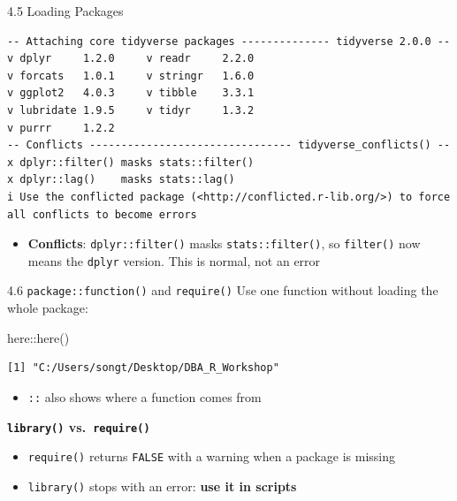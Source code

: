 \documentclass[
  ignorenonframetext,
  aspectratio=169,
]{beamer}
\newenvironment{Shaded}{\begin{snugshade}}{\end{snugshade}}
\newcommand{\FunctionTok}[1]{\textcolor[rgb]{0.28,0.35,0.67}{#1}}
\newcommand{\NormalTok}[1]{\textcolor[rgb]{0.00,0.23,0.31}{#1}}
\newcommand{\SpecialCharTok}[1]{\textcolor[rgb]{0.37,0.37,0.37}{#1}}
\providecommand{\tightlist}{%
  \setlength{\itemsep}{0pt}\setlength{\parskip}{0pt}}
\begin{document}
\begin{frame}[fragile]{4.5 Loading Packages}
\endgroup

\begingroup\tiny\color{darkgray}

\begin{verbatim}
-- Attaching core tidyverse packages -------------- tidyverse 2.0.0 --
v dplyr     1.2.0     v readr     2.2.0
v forcats   1.0.1     v stringr   1.6.0
v ggplot2   4.0.3     v tibble    3.3.1
v lubridate 1.9.5     v tidyr     1.3.2
v purrr     1.2.2     
-- Conflicts -------------------------------- tidyverse_conflicts() --
x dplyr::filter() masks stats::filter()
x dplyr::lag()    masks stats::lag()
i Use the conflicted package (<http://conflicted.r-lib.org/>) to force all conflicts to become errors
\end{verbatim}

\endgroup

\begin{itemize}
\tightlist
\item
  \textbf{Conflicts}: \texttt{dplyr::filter()} masks
  \texttt{stats::filter()}, so \texttt{filter()} now means the
  \texttt{dplyr} version. This is normal, not an error
\end{itemize}
\end{frame}

\begin{frame}[fragile]{4.6 \texttt{package::function()} and
\texttt{require()}}
\protect{}\label{packagefunction-and-require}
Use one function without loading the whole package:

\begin{Shaded}
\begin{Highlighting}[]
\NormalTok{here}\SpecialCharTok{::}\FunctionTok{here}\NormalTok{()}
\end{Highlighting}
\end{Shaded}

\begingroup\tiny\color{darkgray}

\begin{verbatim}
[1] "C:/Users/songt/Desktop/DBA_R_Workshop"
\end{verbatim}

\endgroup

\begin{itemize}
\tightlist
\item
  \texttt{::} also shows where a function comes from
\end{itemize}

\textbf{\texttt{library()} vs.~\texttt{require()}}

\begin{itemize}
\tightlist
\item
  \texttt{require()} returns \texttt{FALSE} with a warning when a
  package is missing
\item
  \texttt{library()} stops with an error: \textbf{use it in scripts}
\end{itemize}
\end{frame}
\end{document}
